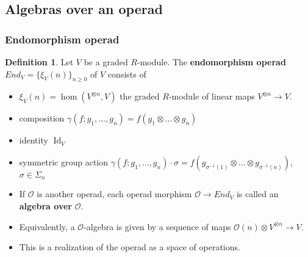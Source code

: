 \documentclass{beamer}
\theoremstyle{definition}
\newtheorem{defi}{Definition}
\begin{document}
\subsection{Algebras over an operad}
\begin{frame}
	\frametitle{Endomorphism operad}
	
	\begin{defi}
		Let $V$ be a graded $R$-module. The \textbf{endomorphism operad} $End_V = \{ \xi_V(n) \}_{n\geq 0}$ of $V$ consists of
		\begin{itemize}
			\item<1-> $\xi_V(n)=\hom(V^{\otimes n},V)
			$ the graded $R$-module of linear maps $V^{\otimes n} \to V$.
			\item<2-> composition $\gamma(f; g_1, \dots, g_n)= f(g_1\otimes\dots\otimes g_n)$
			\item<3-> identity $\operatorname{Id}_V$
			\item<4->  symmetric group action $\gamma (f; g_1, \dots, g_n) \cdot \sigma = f (g_{\sigma^{-1}(1)} \otimes \dots \otimes g_{\sigma^{-1}(n)})$,  $\sigma \in \Sigma_n$ %
		\end{itemize}
	\end{defi}
\end{frame}
\begin{frame}
\begin{itemize}
\item<1->
If $\mathcal{O}$ is another operad, each operad morphism $\mathcal{O} \to End_V$ is called an \textbf{algebra over} $\mathcal{O}$. 
\item<2->Equivalently, a $\mathcal{O}$-algebra is given by a sequence of maps $\mathcal{O}(n)\otimes V^{\otimes n}\to V$.
\item<3-> This is a realization of the operad as a space of operations.
\end{itemize}
\end{frame}
\end{document}
